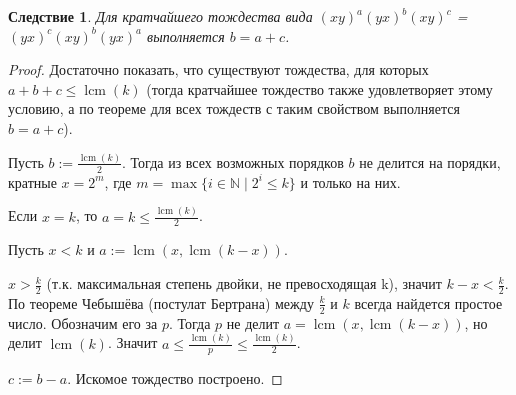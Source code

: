 \documentclass{article}
\newtheorem{corollary}{Следствие}
\DeclareMathOperator{\lcm}{lcm}
\begin{document}
	\begin{corollary}
		Для кратчайшего тождества вида $(xy)^a(yx)^b(xy)^c$ = $(yx)^c(xy)^b(yx)^a$ выполняется $b = a + c$.
	\end{corollary}

	\begin{proof}
		Достаточно показать, что существуют тождества, для которых $a + b + c \le \lcm(k)$ (тогда кратчайшее тождество также удовлетворяет этому условию, а по теореме для всех тождеств с таким свойством выполняется $b = a + c$).
		
		Пусть $b := \frac{\lcm(k)}{2}$. Тогда из всех возможных порядков $b$ не делится на порядки, кратные $x = 2^m$, где $m = \max\{i \in \mathbb{N} \mid 2^i \le k\}$ и только на них.
		
		Если $x = k$, то $a = k \le \frac{\lcm(k)}{2}$.
		
		Пусть $x < k$ и $a := \lcm(x, \lcm(k - x))$. 
		
		$x > \frac{k}{2}$ (т.к. максимальная степень двойки, не превосходящая k), значит $k - x < \frac{k}{2}$. По теореме Чебышёва (постулат Бертрана) между $\frac{k}{2}$ и $k$ всегда найдется простое число. Обозначим его за $p$. Тогда $p$ не делит $a = \lcm(x, \lcm(k - x))$, но делит $\lcm(k)$. Значит $a \le \frac{\lcm(k)}{p} \le  \frac{\lcm(k)}{2}$.
		
		$c := b - a$. Искомое тождество построено.	
	\end{proof}
	
\end{document}
